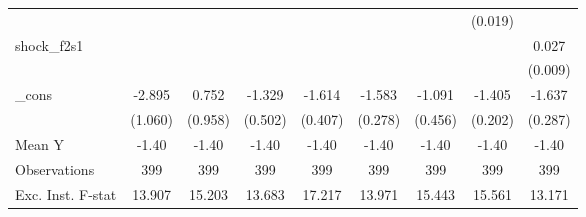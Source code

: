 {\begin{tabular}{l*{8}{c}}
            &                     &                     &                     &                     &                     &                     &     (0.019)         &                     \\
\addlinespace
shock\_f2s1  &                     &                     &                     &                     &                     &                     &                     &       0.027\sym{***}\\
            &                     &                     &                     &                     &                     &                     &                     &     (0.009)         \\
\addlinespace
\_cons      &      -2.895\sym{**} &       0.752         &      -1.329\sym{**} &      -1.614\sym{***}&      -1.583\sym{***}&      -1.091\sym{**} &      -1.405\sym{***}&      -1.637\sym{***}\\
            &     (1.060)         &     (0.958)         &     (0.502)         &     (0.407)         &     (0.278)         &     (0.456)         &     (0.202)         &     (0.287)         \\
\midrule
Mean Y      &       -1.40         &       -1.40         &       -1.40         &       -1.40         &       -1.40         &       -1.40         &       -1.40         &       -1.40         \\
Observations&         399         &         399         &         399         &         399         &         399         &         399         &         399         &         399         \\
Exc. Inst. F-stat&      13.907         &      15.203         &      13.683         &      17.217         &      13.971         &      15.443         &      15.561         &      13.171         \\
\bottomrule
\end{tabular}
}
